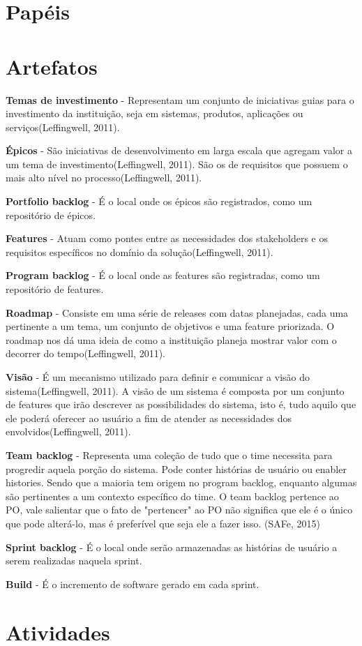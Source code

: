 \section{Papéis}

\section{Artefatos}
\textbf{Temas de investimento} - Representam um conjunto de iniciativas guias para o investimento da instituição, seja em sistemas, produtos, aplicações ou serviços(Leffingwell, 2011).

\textbf{Épicos} - São iniciativas de desenvolvimento em larga escala que agregam valor a um tema de investimento(Leffingwell, 2011). São os de requisitos que possuem o mais alto nível no processo(Leffingwell, 2011).

\textbf{Portfolio backlog} - É o local onde os épicos são registrados, como um repositório de épicos.

\textbf{Features} - Atuam como pontes entre as necessidades dos stakeholders e os requisitos específicos no domínio da solução(Leffingwell, 2011).

\textbf{Program backlog} - É o local onde as features são registradas, como um repositório de features.

\textbf{Roadmap} - Consiste em uma série de releases com datas planejadas, cada uma pertinente a um tema, um conjunto de objetivos e uma feature priorizada. O roadmap nos dá uma ideia de como a instituição planeja mostrar valor com o decorrer do tempo(Leffingwell, 2011).

\textbf{Visão} - É um mecanismo utilizado para definir e comunicar a visão do sistema(Leffingwell, 2011). A visão de um sistema é composta por um conjunto de features que irão descrever as possibilidades do sistema, isto é, tudo aquilo que ele poderá oferecer ao usuário a fim de atender as necessidades dos envolvidos(Leffingwell, 2011).

\textbf{Team backlog} - Representa uma coleção de tudo que o time necessita para progredir aquela porção do sistema. Pode conter histórias de usuário ou enabler histories. Sendo que a maioria tem origem no program backlog, enquanto algumas são pertinentes a um contexto específico do time. O team backlog pertence ao PO, vale salientar que o fato de "pertencer" ao PO não significa que ele é o único que pode alterá-lo, mas é preferível que seja ele a fazer isso. (SAFe, 2015)

\textbf{Sprint backlog} - É o local onde serão armazenadas as histórias de usuário a serem realizadas naquela sprint.

\textbf{Build} - É o incremento de software gerado em cada sprint.

\section{Atividades}
